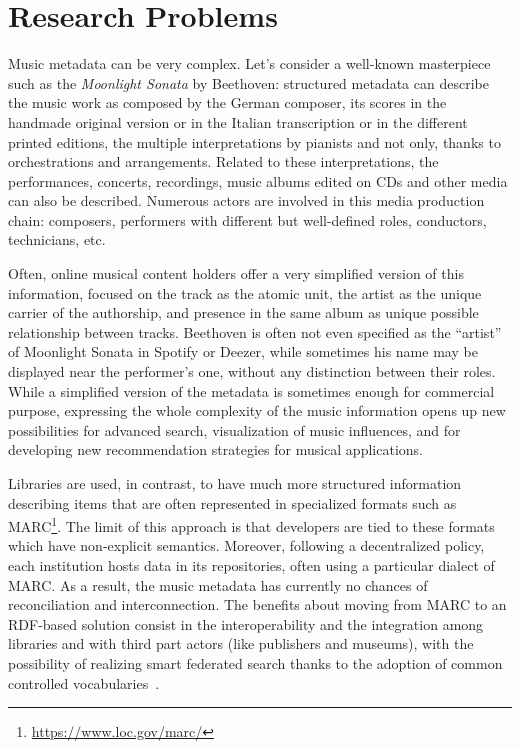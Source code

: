 \documentclass[a4paper,11pt]{report}
\begin{document}
\chapter{Research Problems}

Music metadata can be very complex. Let's consider a well-known masterpiece such as the \textit{Moonlight Sonata} by Beethoven: structured metadata can describe the music work as composed by the German composer, its scores in the handmade original version or in the Italian transcription or in the different printed editions, the multiple interpretations by pianists and not only, thanks to orchestrations and arrangements. Related to these interpretations, the performances, concerts, recordings, music albums edited on CDs and other media can also be described. Numerous actors are involved in this media production chain: composers, performers with different but well-defined roles, conductors, technicians, etc.

Often, online musical content holders offer a very simplified version of this information, focused on the track as the atomic unit, the artist as the unique carrier of the authorship, and presence in the same album as unique possible relationship between tracks. Beethoven is often not even specified as the ``artist'' of Moonlight Sonata in Spotify or Deezer, while sometimes his name may be displayed near the performer's one, without any distinction between their roles. While a simplified version of the metadata is sometimes enough for commercial purpose, expressing the whole complexity of the music information opens up new possibilities for advanced search, visualization of music influences, and for developing new recommendation strategies for musical applications.

Libraries are used, in contrast, to have much more structured information describing items that are often represented in specialized formats such as MARC\footnote{\url{https://www.loc.gov/marc/}}. The limit of this approach is that developers are tied to these formats which have non-explicit semantics. Moreover, following a decentralized policy, each institution hosts data in its repositories, often using a particular dialect of MARC. As a result, the music metadata has currently no chances of reconciliation and interconnection. The benefits about moving from MARC to an RDF-based solution consist in the interoperability and the integration among libraries and with third part actors (like publishers and museums), with the possibility of realizing smart federated search thanks to the adoption of common controlled vocabularies~\cite{byrne2010strongest}.
\end{document}
